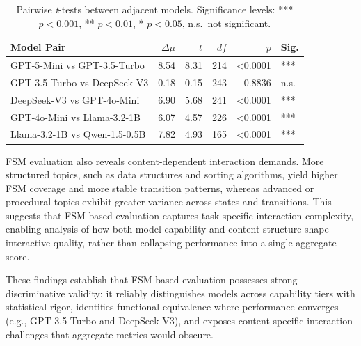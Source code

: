 \begin{table}[t]
\centering
\caption{Pairwise \textit{t}-tests between adjacent models. Significance levels: *** $p<0.001$, ** $p<0.01$, * $p<0.05$, n.s.~not significant.}
\label{tab:pairwise-tests}
\small
\begin{tabular}{lrrrrl}
\toprule
\textbf{Model Pair} & \textbf{$\Delta\mu$} & \textbf{$t$} & \textbf{$df$} & \textbf{$p$} & \textbf{Sig.} \\
\midrule
GPT-5-Mini vs GPT-3.5-Turbo & 8.54 & 8.31 & 214 & <0.0001 & *** \\
GPT-3.5-Turbo vs DeepSeek-V3 & 0.18 & 0.15 & 243 & 0.8836 & n.s. \\
DeepSeek-V3 vs GPT-4o-Mini & 6.90 & 5.68 & 241 & <0.0001 & *** \\
GPT-4o-Mini vs Llama-3.2-1B & 6.07 & 4.57 & 226 & <0.0001 & *** \\
Llama-3.2-1B vs Qwen-1.5-0.5B & 7.82 & 4.93 & 165 & <0.0001 & *** \\
\bottomrule
\end{tabular}
\end{table}

FSM evaluation also reveals content-dependent interaction demands. More structured topics, such as data structures and sorting algorithms, yield higher FSM coverage and more stable transition patterns, whereas advanced or procedural topics exhibit greater variance across states and transitions. This suggests that FSM-based evaluation captures task-specific interaction complexity, enabling analysis of how both model capability and content structure shape interactive quality, rather than collapsing performance into a single aggregate score.

These findings establish that FSM-based evaluation possesses strong discriminative validity: it reliably distinguishes models across capability tiers with statistical rigor, identifies functional equivalence where performance converges (e.g., GPT-3.5-Turbo and DeepSeek-V3), and exposes content-specific interaction challenges that aggregate metrics would obscure.
